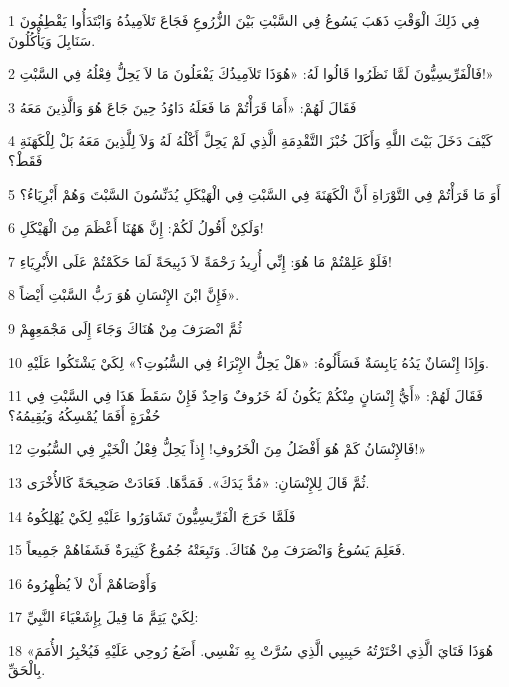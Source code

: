 \par 1 فِي ذَلِكَ الْوَقْتِ ذَهَبَ يَسُوعُ فِي السَّبْتِ بَيْنَ الزُّرُوعِ فَجَاعَ تَلاَمِيذُهُ وَابْتَدَأُوا يَقْطِفُونَ سَنَابِلَ وَيَأْكُلُونَ.
\par 2 فَالْفَرِّيسِيُّونَ لَمَّا نَظَرُوا قَالُوا لَهُ: «هُوَذَا تَلاَمِيذُكَ يَفْعَلُونَ مَا لاَ يَحِلُّ فِعْلُهُ فِي السَّبْتِ!»
\par 3 فَقَالَ لَهُمْ: «أَمَا قَرَأْتُمْ مَا فَعَلَهُ دَاوُدُ حِينَ جَاعَ هُوَ وَالَّذِينَ مَعَهُ
\par 4 كَيْفَ دَخَلَ بَيْتَ اللَّهِ وَأَكَلَ خُبْزَ التَّقْدِمَةِ الَّذِي لَمْ يَحِلَّ أَكْلُهُ لَهُ وَلاَ لِلَّذِينَ مَعَهُ بَلْ لِلْكَهَنَةِ فَقَطْ؟
\par 5 أَوَ مَا قَرَأْتُمْ فِي التَّوْرَاةِ أَنَّ الْكَهَنَةَ فِي السَّبْتِ فِي الْهَيْكَلِ يُدَنِّسُونَ السَّبْتَ وَهُمْ أَبْرِيَاءُ؟
\par 6 وَلَكِنْ أَقُولُ لَكُمْ: إِنَّ هَهُنَا أَعْظَمَ مِنَ الْهَيْكَلِ!
\par 7 فَلَوْ عَلِمْتُمْ مَا هُوَ: إِنِّي أُرِيدُ رَحْمَةً لاَ ذَبِيحَةً لَمَا حَكَمْتُمْ عَلَى الأَبْرِيَاءِ!
\par 8 فَإِنَّ ابْنَ الإِنْسَانِ هُوَ رَبُّ السَّبْتِ أَيْضاً».
\par 9 ثُمَّ انْصَرَفَ مِنْ هُنَاكَ وَجَاءَ إِلَى مَجْمَعِهِمْ
\par 10 وَإِذَا إِنْسَانٌ يَدُهُ يَابِسَةٌ فَسَأَلُوهُ: «هَلْ يَحِلُّ الإِبْرَاءُ فِي السُّبُوتِ؟» لِكَيْ يَشْتَكُوا عَلَيْهِ.
\par 11 فَقَالَ لَهُمْ: «أَيُّ إِنْسَانٍ مِنْكُمْ يَكُونُ لَهُ خَرُوفٌ وَاحِدٌ فَإِنْ سَقَطَ هَذَا فِي السَّبْتِ فِي حُفْرَةٍ أَفَمَا يُمْسِكُهُ وَيُقِيمُهُ؟
\par 12 فَالإِنْسَانُ كَمْ هُوَ أَفْضَلُ مِنَ الْخَرُوفِ! إِذاً يَحِلُّ فِعْلُ الْخَيْرِ فِي السُّبُوتِ!»
\par 13 ثُمَّ قَالَ لِلإِنْسَانِ: «مُدَّ يَدَكَ». فَمَدَّهَا. فَعَادَتْ صَحِيحَةً كَالأُخْرَى.
\par 14 فَلَمَّا خَرَجَ الْفَرِّيسِيُّونَ تَشَاوَرُوا عَلَيْهِ لِكَيْ يُهْلِكُوهُ
\par 15 فَعَلِمَ يَسُوعُ وَانْصَرَفَ مِنْ هُنَاكَ. وَتَبِعَتْهُ جُمُوعٌ كَثِيرَةٌ فَشَفَاهُمْ جَمِيعاً.
\par 16 وَأَوْصَاهُمْ أَنْ لاَ يُظْهِرُوهُ
\par 17 لِكَيْ يَتِمَّ مَا قِيلَ بِإِشَعْيَاءَ النَّبِيِّ:
\par 18 «هُوَذَا فَتَايَ الَّذِي اخْتَرْتُهُ حَبِيبِي الَّذِي سُرَّتْ بِهِ نَفْسِي. أَضَعُ رُوحِي عَلَيْهِ فَيُخْبِرُ الأُمَمَ بِالْحَقِّ.
